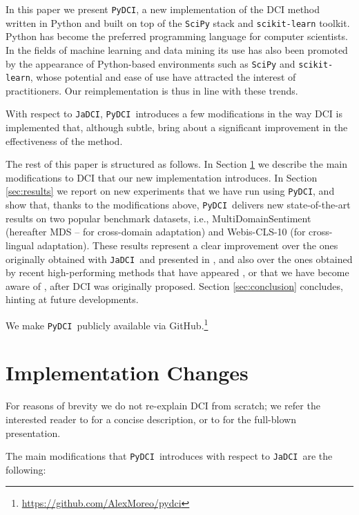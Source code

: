 \documentclass{article}
\newcommand{\jadci}{\texttt{JaDCI}}
\newcommand{\pydci}{\texttt{PyDCI}}
\begin{document}
In this paper we present \pydci, a new implementation of the DCI
method written in Python and built on top of the \texttt{SciPy} stack
and \texttt{scikit-learn} toolkit. Python has become the preferred
programming language for computer scientists. In the fields of machine
learning and data mining its use has also been promoted by the
appearance of Python-based environments such as \texttt{SciPy} and
\texttt{scikit-learn}, whose potential and ease of use have attracted
the interest of practitioners. Our reimplementation is thus in line
with these trends.

With respect to \jadci, \pydci\ introduces a few modifications in the
way DCI is implemented that, although subtle, bring about a
significant improvement in the effectiveness of the method.

The rest of this paper is structured as follows. In Section
\ref{sec:changes} we describe the main modifications to DCI that our
new implementation introduces. In Section \ref{sec:results} we report
on new experiments that we have run using \pydci, and show that,
thanks to the modifications above, \pydci\ delivers new
state-of-the-art results on two popular benchmark datasets, i.e.,
MultiDomainSentiment (hereafter MDS -- for cross-domain adaptation)
and Webis-CLS-10 (for cross-lingual adaptation). These results
represent a clear improvement over the ones originally obtained with
\jadci\ and presented in \cite{Moreo:2016fg}, and also over the ones
obtained by recent high-performing methods that have appeared
\cite{ganin2016domain,Li:2017kg,xu2017cross,zhou2016cross}, or that we
have become aware of \cite{Yang:2015nb}, after DCI was originally
proposed. Section \ref{sec:conclusion} concludes, hinting at future
developments.

We make \pydci\ publicly available via
GitHub.\footnote{\url{https://github.com/AlexMoreo/pydci}}




\section{Implementation Changes}\label{sec:changes}

\noindent For reasons of brevity we do not re-explain DCI from
scratch;
we refer the interested reader to \citep{Moreo-Fernandez:2018ss} for a
concise description, or to \citep{Moreo:2016fg} for the full-blown
presentation.

The main modifications that \pydci\ introduces with respect to \jadci\
are the following:
\end{document}
